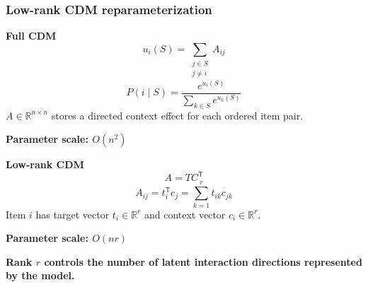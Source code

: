 \documentclass[white,aspect-ratio=16:9]{uom_ltx_talk_casson}
\newcommand{\sectionemphasis}[1]{\textcolor{IITMBlue}{\textbf{#1}}}
\newcommand{\result}[1]{\textcolor{ResultGreen}{\textbf{#1}}}
\begin{document}
\begin{frame}
  \frametitle{Low-rank CDM reparameterization}
  \small
  \begin{minipage}[t]{0.45\textwidth}
    \vspace{0pt}
    \sectionemphasis{Full CDM}
    \vspace{0.08cm}
    \[
      u_i(S)=\sum_{\substack{j\in S\\j\neq i}} A_{ij}
    \]
    \[
      P(i\mid S)=\frac{e^{u_i(S)}}{\sum_{k\in S}e^{u_k(S)}}
    \]
    $A\in\mathbb{R}^{n\times n}$ stores a directed context effect for each ordered item pair.

    \vspace{0.12cm}
    \centering\textbf{Parameter scale: $O(n^2)$}
  \end{minipage}
  \hfill
  \begin{minipage}[t]{0.45\textwidth}
    \vspace{0pt}
    \textcolor{IITMGold}{\textbf{Low-rank CDM}}
    \vspace{0.08cm}
    \[
      A=TC^{\mathsf T}
    \]
    \[
      A_{ij}=t_i^{\mathsf T}c_j
      =\sum_{k=1}^{r}t_{ik}c_{jk}
    \]
    Item $i$ has target vector $t_i\in\mathbb{R}^{r}$ and context vector $c_i\in\mathbb{R}^{r}$.

    \vspace{0.12cm}
    \centering\textbf{Parameter scale: $O(nr)$}
  \end{minipage}

  \vfill
  \centering
  {\footnotesize\result{Rank $r$ controls the number of latent interaction directions represented by the model.}}
\end{frame}
\end{document}
